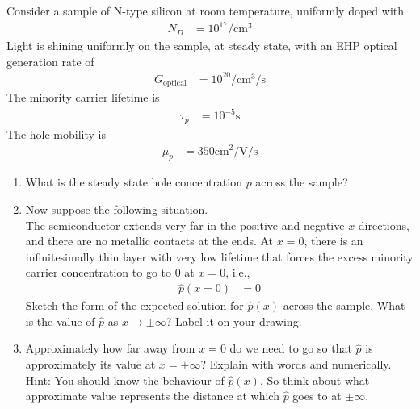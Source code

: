 \documentclass[fleqn, a4paper, 11pt, oneside]{amsart}
\theoremstyle{definition}
\theoremstyle{theorem}
\begin{document}
\begin{question}
	Consider a sample of N-type silicon at room temperature, uniformly doped with
	\begin{align*}
		N_D & = 10^{17} \si{\per\centi\metre\cubed}
	\end{align*}
	Light is shining uniformly on the sample, at steady state, with an EHP optical generation rate of
	\begin{align*}
		G_{\text{optical}} & = 10^{20} \si{\per\centi\metre\cubed\per\second}
	\end{align*}
	The minority carrier lifetime is
	\begin{align*}
		\tau_p & = 10^{-5} \si{\second}
	\end{align*}
	The hole mobility is
	\begin{align*}
		\mu_p & = 350 \si{\centi\metre\squared\per\volt\per\second}
	\end{align*}
	\begin{enumerate}
		\item
			What is the steady state hole concentration $p$ across the sample?
		\item
			Now suppose the following situation.\\
			The semiconductor extends very far in the positive and negative $x$ directions, and there are no metallic contacts at the ends.
			At $x = 0$, there is an infinitesimally thin layer with very low lifetime that forces the excess minority carrier concentration to go to $0$ at $x = 0$, i.e.,
			\begin{align*}
				\hat{p}(x = 0) & = 0
			\end{align*}
			Sketch the form of the expected solution for $\hat{p}(x)$ across the sample.
			What is the value of $\hat{p}$ as $x \to \pm\infty$?
			Label it on your drawing.
		\item
			Approximately how far away from $x = 0$ do we need to go so that $\hat{p}$ is approximately its value at $x = \pm\infty$?
			Explain with words and numerically.
			Hint: You should know the behaviour of $\hat{p}(x)$.
			So think about what approximate value represents the distance at which $\hat{p}$ goes to at $\pm\infty$.
	\end{enumerate}
\end{question}
\end{document}
